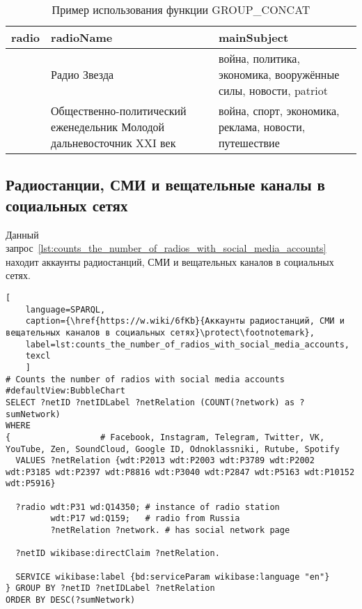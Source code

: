 \begin{table}[ht]
\centering
\caption{Пример использования функции GROUP\_CONCAT}
\begin{tabular}{|p{14em}|p{10em}|p{10em}|}
\hline
radio & radioName & mainSubject \\
\hline
\href{Q4387399} & Радио Звезда & война, политика, экономика, вооружённые силы, новости, patriot \\
\hline
\href{Q30909585} & Общественно-политический еженедельник Молодой дальневосточник XXI век & война, спорт, экономика, реклама, новости, путешествие \\
\hline
\end{tabular}
\label{tab:example_of_using_the_function}
\end{table}

\newpage

\subsection{Радиостанции, СМИ и вещательные каналы в социальных сетях}

Данный запрос~\ref{lst:counts_the_number_of_radios_with_social_media_accounts} находит аккаунты радиостанций, СМИ и вещательных каналов в социальных сетях.

\begin{lstlisting}[ 
    language=SPARQL,
    caption={\href{https://w.wiki/6fKb}{Аккаунты радиостанций, СМИ и вещательных каналов в социальных сетях}\protect\footnotemark},
    label=lst:counts_the_number_of_radios_with_social_media_accounts,
    texcl
    ]
# Counts the number of radios with social media accounts
#defaultView:BubbleChart
SELECT ?netID ?netIDLabel ?netRelation (COUNT(?network) as ?sumNetwork)
WHERE
{                  # Facebook, Instagram, Telegram, Twitter, VK, YouTube, Zen, SoundCloud, Google ID, Odnoklassniki, Rutube, Spotify
  VALUES ?netRelation {wdt:P2013 wdt:P2003 wdt:P3789 wdt:P2002 wdt:P3185 wdt:P2397 wdt:P8816 wdt:P3040 wdt:P2847 wdt:P5163 wdt:P10152 wdt:P5916}
  
  ?radio wdt:P31 wd:Q14350; # instance of radio station
         wdt:P17 wd:Q159;   # radio from Russia
         ?netRelation ?network. # has social network page

  ?netID wikibase:directClaim ?netRelation.
  
  SERVICE wikibase:label {bd:serviceParam wikibase:language "en"}
} GROUP BY ?netID ?netIDLabel ?netRelation 
ORDER BY DESC(?sumNetwork)\end{lstlisting}%

